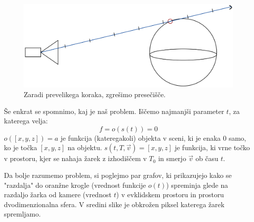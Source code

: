 \documentclass[titlepage]{article}
\begin{document}
\begin{figure} [H]
  \centering
  \includegraphics[width=0.6\linewidth]{Images/step_size_issue.png}
  \caption{Zaradi prevelikega koraka, zgrešimo presečišče.}
  \label{fig:step_size_issue}
\end{figure}

Še enkrat se spomnimo, kaj je naš problem. Iščemo najmanjši parameter \( t \), za katerega velja:
\[ f = o(s(t)) = 0 \]
\( o([x, y, z]) = a \) je funkcija (kateregakoli) objekta v sceni, ki je enaka 0 samo, ko je 
točka \([x, y, z]\) na objektu. 
\( s(t, T, \vec{v}) = [x, y, z] \) je funkcija, ki vrne točko v prostoru, kjer se nahaja žarek z izhodiščem v \( T_0\) in smerjo 
\( \vec{v} \) ob času \( t \).


Da bolje razumemo problem, si poglejmo par grafov, ki prikazujejo kako se 
"razdalja" do oranžne krogle (vrednost funkcije \( o(t) \)) spreminja glede na razdaljo žarka od 
kamere (vrednost \( t \)) v evklidskem prostoru in prostoru dvodimenzionalna sfera. V sredini slike je obkrožen piksel katerega žarek spremljamo.
\end{document}
